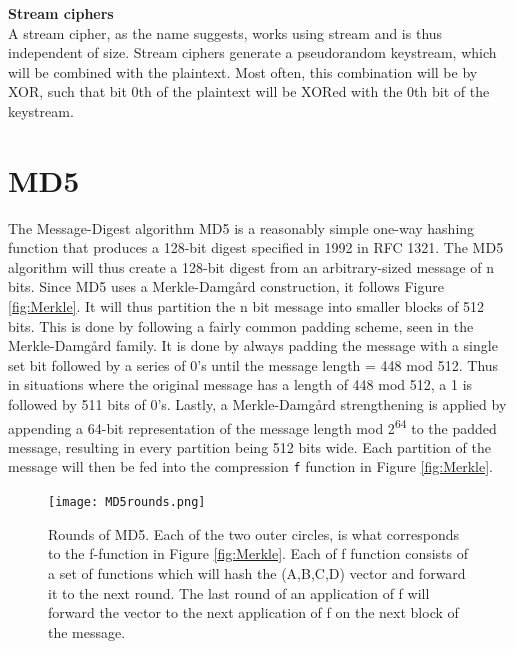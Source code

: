\documentclass[a4paper, openany]{book}
\begin{document}
\textbf{Stream ciphers}\\
A stream cipher, as the name suggests, works using stream and is thus independent of size. Stream ciphers generate a pseudorandom keystream, which will be combined with the plaintext. Most often, this combination will be by XOR, such that bit 0th of the plaintext will be XORed with the 0th bit of the keystream.

\section{MD5}
\label{MD5alg}
The Message-Digest algorithm MD5 is a reasonably simple one-way hashing function that produces a 128-bit digest specified in 1992 in RFC 1321\cite{rfc1321}.
The MD5 algorithm will thus create a 128-bit digest from an arbitrary-sized message of n bits. Since MD5 uses a Merkle-Damgård construction, it follows Figure \ref{fig:Merkle}. It will thus partition the n bit message into smaller blocks of 512 bits. This is done by following a fairly common padding scheme, seen in the Merkle-Damgård family. It is done by always padding the message with a single set bit followed by a series of 0's until the message length = 448 mod 512. Thus in situations where the original message has a length of 448 mod 512, a 1 is followed by 511 bits of 0's. Lastly, a Merkle-Damgård strengthening is applied by appending a 64-bit representation of the message length mod 2\textsuperscript{64} to the padded message, resulting in every partition being 512 bits wide.
Each partition of the message will then be fed into the compression \texttt{f} function in Figure \ref{fig:Merkle}.


\begin{figure}[!htb]
\centering
\texttt{[image: MD5rounds.png]}
\caption[MD5 Rounds]%
{Rounds of MD5. Each of the two outer circles, is what corresponds to the f-function in Figure \ref{fig:Merkle}. Each of f function consists of a set of functions which will hash the (A,B,C,D) vector and forward it to the next round. The last round of an application of f will forward the vector to the next application of f on the next block of the message.}
\label{fig:MD5}
\end{figure}
\end{document}

